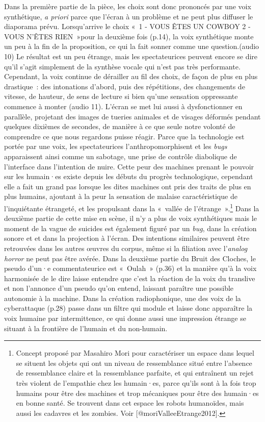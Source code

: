 \documentclass[
]{article}
\begin{document}
Dans la première partie de la pièce, les choix sont donc prononcés par une voix synthétique, \emph{a priori} parce que l'écran à un problème et ne peut plus diffuser le diaporama prévu. Lorsqu'arrive le choix «~1 - VOUS ÊTES UN COWBOY 2 - VOUS N'ÊTES RIEN~»pour la deuxième fois (p.14), la voix synthétique monte un peu à la fin de la proposition, ce qui la fait sonner comme une question.(audio 10) Le résultat est un peu étrange, mais les spectateurices peuvent encore se dire qu'il s'agit simplement de la synthèse vocale qui n'est pas très performante. Cependant, la voix continue de dérailler au fil des choix, de façon de plus en plus drastique~: des intonations d'abord, puis des répétitions, des changements de vitesse, de hauteur, de sens de lecture si bien qu'une sensation oppressante commence à monter (audio 11). L'écran se met lui aussi à dysfonctionner en parallèle, projetant des images de tueries animales et de visages déformés pendant quelques dixièmes de secondes, de manière à ce que seule notre volonté de comprendre ce que nous regardons puisse réagir. Parce que la technologie est portée par une voix, les spectateurices l'anthropomorphisent et les \emph{bugs} apparaissent ainsi comme un sabotage, une prise de contrôle diabolique de l'interface dans l'intention de nuire. Cette peur des machines prenant le pouvoir sur les humain·es existe depuis les débuts du progrès technologique, cependant elle a fait un grand pas lorsque les dites machines ont pris des traits de plus en plus humains, ajoutant à la peur la sensation de malaise caractéristique de l'inquiétante étrangeté, et les propulsant dans la «~vallée de l'étrange~».\footnote{Concept proposé par Masahiro Mori pour caractériser un espace dans lequel se situent les objets qui ont un niveau de ressemblance situé entre l'absence de ressemblance claire et la ressemblance parfaite, et qui entraînent un rejet très violent de l'empathie chez les humain·es, parce qu'ils sont à la fois trop humains pour être des machines et trop mécaniques pour être des humain·es en bonne santé. Se trouvent dans cet espace les robots humanoïdes, mais aussi les cadavres et les zombies. Voir {[}@moriValleeEtrange2012{]}.} Dans la deuxième partie de cette mise en scène, il n'y a plus de voix synthétiques mais le moment de la vague de suicides est également figuré par un \emph{bug}, dans la création sonore et et dans la projection à l'écran. Des intentions similaires peuvent être retrouvées dans les autres œuvres du corpus, même si la filiation avec l'\emph{analog horror} ne peut pas être avérée. Dans la deuxième partie du Bruit des Cloches, le pseudo d'un·e commentateurice est «~Oulah~» (p.36) et la manière qu'à la voix harmonisée de le dire laisse entendre que c'est la réaction de la voix du translive et non l'annonce d'un pseudo qu'on entend, laissant paraître une possible autonomie à la machine. Dans la création radiophonique, une des voix de la cyberattaque (p.28) passe dans un filtre qui module et laisse donc apparaître la voix humaine par intermittence, ce qui donne aussi une impression étrange se situant à la frontière de l'humain et du non-humain.
\end{document}

